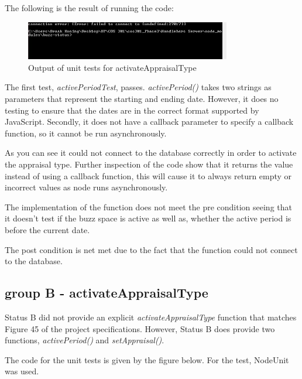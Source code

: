 \documentclass[a4paper,12pt]{article}
\begin{document}
The following is the result of running the code:

	\begin{figure}[H]
		\centering
		\includegraphics[width=0.8\textwidth]{Figures/activateTypeAResult.jpg}
		\caption{Output of unit tests for activateAppraisalType}
	\end{figure}

The first test, \textit{activePeriodTest}, passes. \textit{activePeriod()} takes two strings as parameters that represent the starting and ending date. However, it does no testing to ensure that the dates are in the correct format supported by JavaScript. Secondly, it does not have a callback parameter to specify a callback function, so it cannot be run asynchronously.

As you can see it could not connect to the database correctly in order to activate the appraisal type. Further inspection of the code show that it returns the value instead of using a callback function, this will cause it to always return empty or incorrect values as node runs asynchronously.

The implementation of the function does not meet the pre condition seeing that it doesn't test if the buzz space is active as well as, whether the active period is before the current date.

The post condition is net met due to the fact that the function could not connect to the database.

\subsection{group B - activateAppraisalType}

Status B did not provide an explicit \textit{activateAppraisalType} function that matches Figure 45 of the project specifications.
However, Status B does provide two functions, \textit{activePeriod()} and \textit{setAppraisal()}.

The code for the unit tests is given by the figure below. For the test, NodeUnit was used.
\end{document}
